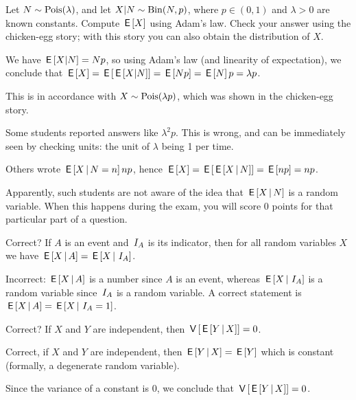 \documentclass[assignments]{subfiles}
\begin{document}
\begin{exercise}
Let $N \sim \mathrm{Pois}(\lambda)$, and let $X|N \sim \mathrm{Bin}(N, p)$, where $p \in (0,1)$ and $\lambda > 0$ are known constants.
Compute $\,\mathsf{E}\left[X\right]$ using Adam's law.
Check your answer using the chicken-egg story; with this story you can also obtain the distribution of $X$.
\begin{solution}
We have $\,\mathsf{E}\left[X|N\right] = Np$, so using Adam's law (and linearity of expectation), we conclude that $\,\mathsf{E}\left[X\right] = \,\mathsf{E}\left[\,\mathsf{E}\left[X|N\right]\right] = \,\mathsf{E}\left[Np\right] = \,\mathsf{E}\left[N\right]p = \lambda p$.

This is in accordance with $X \sim \mathrm{Pois}(\lambda p)$, which was shown in the chicken-egg story.

Some students reported answers like $\lambda^{2}p$. This is wrong, and can be immediately seen by checking units: the unit of $\lambda$ being 1 per time.

Others wrote $\,\mathsf{E}\left[X\,\middle|\, N= n\right] n p$, hence $\,\mathsf{E}\left[X\right] = \,\mathsf{E}\left[\,\mathsf{E}\left[X\,\middle|\, N\right]\right]= \,\mathsf{E}\left[np\right] = np$.

Apparently, such students are not aware of the idea that $\,\mathsf{E}\left[X\,\middle|\, N\right]$ is a random variable.
When this happens during the exam, you will score 0 points for that particular part of a question.

\end{solution}
\end{exercise}


\begin{exercise}
Correct? If $A$ is an event and $\,I_{A}$ is its indicator, then for all random variables $X$ we have $\,\mathsf{E}\left[X \,\middle|\, A\right] = \,\mathsf{E}\left[X \,\middle|\, \,I_{A}\right]$.
\begin{solution}
Incorrect:  $\,\mathsf{E}\left[X \,\middle|\, A\right]$ is a number since $A$ is an event, whereas $\,\mathsf{E}\left[X \,\middle|\, \,I_{A}\right]$ is a random variable since $\,I_{A}$ is a random variable. A correct statement is $\,\mathsf{E}\left[X \,\middle|\, A\right] = \,\mathsf{E}\left[X \,\middle|\, \,I_{A} = 1\right]$.
\end{solution}
\end{exercise}

\begin{exercise}
Correct? If $X$ and $Y$ are independent, then $\,\mathsf{V}\left[\,\mathsf{E}\left[Y \,\middle|\, X\right]\right] = 0$.
\begin{solution}
Correct, if  $X$ and $Y$ are independent, then $\,\mathsf{E}\left[Y \,\middle|\, X\right] = \,\mathsf{E}\left[Y\right]$ which is constant (formally, a degenerate random variable).

Since the variance of a constant is 0, we conclude that $\,\mathsf{V}\left[\,\mathsf{E}\left[Y \,\middle|\, X\right]\right] = 0$.
\end{solution}
\end{exercise}
\end{document}
